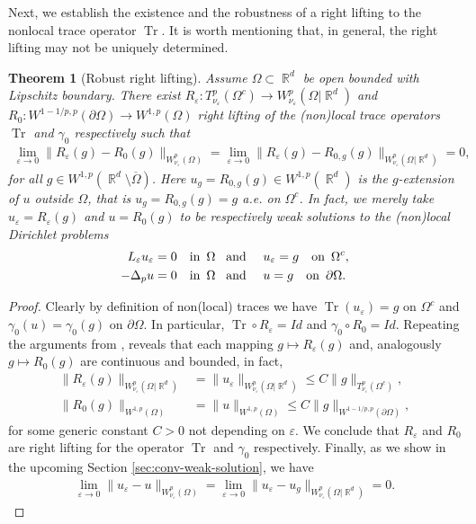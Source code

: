 \documentclass[12pt, reqno]{amsart}%
\theoremstyle{plain}  %
\newtheorem{theorem}{Theorem}[section]
\theoremstyle{definition}  %
\numberwithin{equation}{section}
\DeclareMathOperator{\R}{\mathbb{R}}
\newcommand{\eps}{\varepsilon}
\newcommand{\WnuOmRa}{W^p_{\nu_\eps}(\Omega|\R^d )}
\newcommand{\TnuOma}{T^p_{\nu_\eps} (\Omega^c)}
\newcommand{\WnuOma}{W^{p}_{\nu_\eps}(\Omega)}
\begin{document}
\noindent Next, we establish the existence and the  robustness of a right lifting to the nonlocal trace operator $ \operatorname{Tr}$. It is worth mentioning that, in general, the right lifting may not be uniquely determined.
\begin{theorem}[Robust right lifting]
Assume $\Omega\subset\R^d$ be open  bounded with Lipschitz boundary. There exist $R_\eps: \TnuOma\to \WnuOmRa$ and $R_0:W^{1-1/p , p}(\partial \Omega)\to W^{1,p}(\Omega)$
right lifting of the (non)local trace operators $\operatorname{Tr}$ and $\gamma_0$  respectively such that
\begin{align*}
\lim_{\eps\to0}\|R_\eps(g)-R_0(g)\|_{\WnuOma}= \lim_{\eps\to0}\|R_\eps(g)-R_{0,g}(g)\|_{\WnuOmRa}=0,
\end{align*}
for all $g\in W^{1,p}(\R^d\setminus\overline{\Omega})$. Here $u_g = R_{0,g}(g)\in W^{1,p}(\R^d)$ is the $g$-extension of $u$ outside $\Omega$, that is  $u_g= R_{0,g}(g)= g$ a.e. on $\Omega^c$. In fact, we merely  take $u_\eps= R_\eps(g)$  and  $u= R_0(g)$ to be respectively weak solutions to the (non)local Dirichlet problems
\begin{align*}
L_\eps u_\eps &=0 \quad \text{in $\,\Omega$ \, and } \quad u_\eps= g\quad \text{on $\, \Omega^c$}, \\
-\Delta_p u&=0 \quad \text{in $\, \Omega$\,\,\, and } \quad u= g\quad \text{on $\,\partial \Omega$}.
\end{align*}
\end{theorem}

\begin{proof}
Clearly by definition of non(local) traces we have $\operatorname{Tr}(u_\eps)= g$ on $\Omega^c$ and $\gamma_0(u)= \gamma_0(g)$ on $\partial\Omega$. In particular, $\operatorname{Tr}\circ R_\eps =Id$ and $\gamma_0 \circ R_0 =Id$. Repeating the arguments from  \cite[Sec. 8, \& Sec. 11]{Fog25}, reveals that each mapping $g\mapsto R_\eps(g)$ and, analogously  $g\mapsto R_0(g)$ are continuous and bounded, in fact,
\begin{align*}
\|R_\eps(g)\|_{\WnuOmRa} &=\|u_\eps\|_{\WnuOmRa}
\leq C\|g\|_{\TnuOma},\\
\|R_0(g)\|_{W^{1,p}(\Omega)}&= \|u\|_{W^{1,p}(\Omega)}
\leq C\|g\|_{W^{1-1/p ,p}(\partial\Omega)},
\end{align*}
for some generic constant $C>0$ not depending on $\eps$.
We conclude that $R_\eps$ and $R_0$ are right lifting for the operator  $\operatorname{Tr}$ and $\gamma_0$ respectively.  Finally, as  we show in the upcoming
Section \ref{sec:conv-weak-solution}, we have
\begin{align*}
\lim_{\eps\to0}\|u_\eps-u\|_{\WnuOma}= \lim_{\eps\to0}\|u_\eps-u_g\|_{\WnuOmRa}=0.
\end{align*}
\end{proof}
\end{document}
